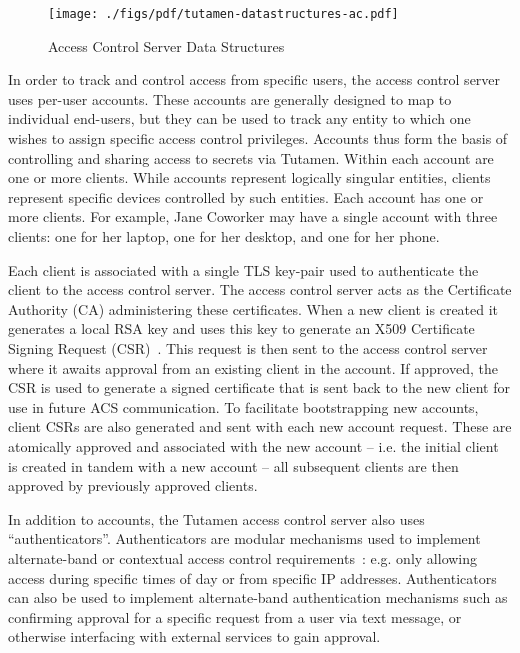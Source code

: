 \begin{figure}[th]
  \centering
  \texttt{[image: ./figs/pdf/tutamen-datastructures-ac.pdf]}
  \caption{Access Control Server Data Structures}
  \label{fig:tutamen:acstructs}
\end{figure}

In order to track and control access from specific users, the access
control server uses per-user accounts. These accounts are generally
designed to map to individual end-users, but they can be used to track
any entity to which one wishes to assign specific
access control privileges. Accounts thus form the basis of controlling
and sharing access to secrets via Tutamen. Within each account are one
or more clients. While accounts represent logically singular entities, 
clients represent specific devices controlled by such entities. Each
account has one or more clients. For example, Jane Coworker may have a
single account with three clients: one for her laptop, one for her
desktop, and one for her phone.

Each client is associated with a single TLS key-pair used to
authenticate the client to the access control server. The access
control server acts as the Certificate Authority (CA) administering
these certificates. When a new client is created it generates a local
RSA key and uses this key to generate an X509 Certificate Signing
Request (CSR)~\cite{rfc5280}. This request is then sent to the access
control server where it awaits approval from an existing client in the
account. If approved, the CSR is used to generate a signed certificate
that is sent back to the new client for use in future ACS
communication. To facilitate bootstrapping new accounts, client CSRs
are also generated and sent with each new account request. These are
atomically approved and associated with the new account -- i.e. the
initial client is created in tandem with a new account -- all
subsequent clients are then approved by previously approved clients.

In addition to accounts, the Tutamen access control server also uses
``authenticators''. Authenticators are modular mechanisms used to
implement alternate-band or contextual access control
requirements~\cite{hulsebosch2005}: e.g. only allowing access during
specific times of day or from specific IP addresses. Authenticators
can also be used to implement alternate-band authentication mechanisms
such as confirming approval for a specific request from a user via
text message, or otherwise interfacing with external services to gain
approval.

